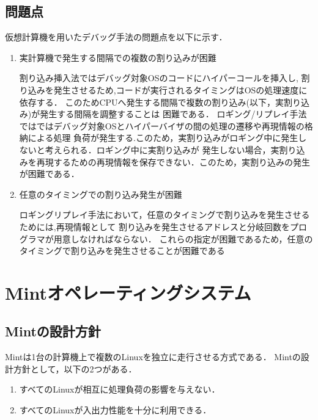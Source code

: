 \documentclass[12pt]{jsarticle}
\begin{document}
\subsection{問題点}
仮想計算機を用いたデバッグ手法の問題点を以下に示す．
\begin{enumerate}

\item 実計算機で発生する間隔での複数の割り込みが困難

割り込み挿入法ではデバッグ対象OSのコードにハイパーコールを挿入し,
割り込みを発生させるため,コードが実行されるタイミングはOSの処理速度に依存する．
このためCPUへ発生する間隔で複数の割り込み(以下，実割り込み)が発生する間隔を調整することは
困難である．
ロギング/リプレイ手法ではではデバッグ対象OSとハイパーバイザの間の処理の遷移や再現情報の格納による処理
負荷が発生する.このため，実割り込みがロギング中に発生しないと考えられる．ロギング中に実割り込みが
発生しない場合，実割り込みを再現するための再現情報を保存できない．このため，実割り込みの発生が困難である．


\item 任意のタイミングでの割り込み発生が困難

ロギングリプレイ手法において，任意のタイミングで割り込みを発生させるためには,再現情報として
割り込みを発生させるアドレスと分岐回数をプログラマが用意しなければならない．
これらの指定が困難であるため，任意のタイミングで割り込みを発生させることが困難である

\end{enumerate}

\section{Mintオペレーティングシステム}
\subsection{Mintの設計方針}
Mintは1台の計算機上で複数のLinuxを独立に走行させる方式である．
Mintの設計方針として，以下の2つがある．
\begin{enumerate}
\item すべてのLinuxが相互に処理負荷の影響を与えない．
\item すべてのLinuxが入出力性能を十分に利用できる．
\end{enumerate}
\end{document}
